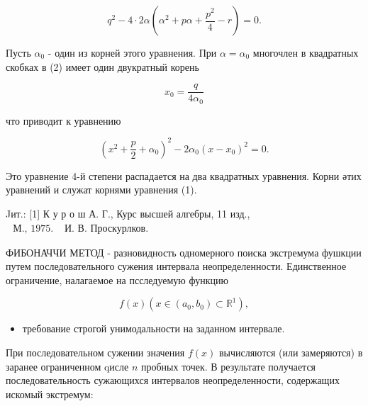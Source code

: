 \documentclass[10pt]{article}
\begin{document}
\[

q^{2}-4 \cdot 2 \alpha\left(\alpha^{2}+p \alpha+\frac{p^{2}}{4}-r\right)=0 .

\]



Пусть $\alpha_{0}$ - один из корней этого уравнения. При $\alpha=\alpha_{0}$ многочлен в квадратных скобках в (2) имеет один двукратный корень



\[

x_{0}=\frac{q}{4 \alpha_{0}}

\]



что приводит к уравнению



\[

\left(x^{2}+\frac{p}{2}+\alpha_{0}\right)^{2}-2 \alpha_{0}\left(x-x_{0}\right)^{2}=0 .

\]



Это уравнение 4-й степени распадается на два квадратных уравнения. Корни әтих уравнений и служат корнями уравнения (1).



Jит.: [1] К у р о ш А. Г., Курс высшей алгебры, 11 изд., $\begin{array}{ll}\text { М., } 1975 . & \text { И. В. Проскурлков. }\end{array}$



ФИБОНАЧЧИ МЕТОД - разновидность одномерного поиска экстремума фушкции путем последовательного сужения интервала неопределенности. Единственное ограничение, налагаемое на псследуемую функцию



\[

f(x)\left(x \in\left(a_{0}, b_{0}\right) \subset \mathbb{R}^{1}\right),

\]



\begin{itemize}

  \item требование строгой унимодальности на заданном интервале.

\end{itemize}



При последовательном сужении значения $f(x)$ вычисляются (или замеряются) в заранее ограниченном qисле $n$ пробных точек. В результате получается последовательность сужающихся интервалов неопределенности, содержащих искомый экстремум:
\end{document}
